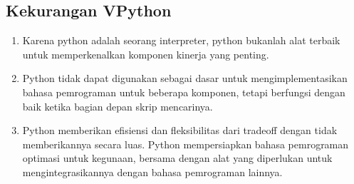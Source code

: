 \subsection{Kekurangan VPython}
		\begin {enumerate}
			
			\item Karena python adalah seorang interpreter, python bukanlah alat terbaik untuk memperkenalkan komponen kinerja yang penting.
			\item Python tidak dapat digunakan sebagai dasar untuk mengimplementasikan bahasa pemrograman untuk beberapa komponen, tetapi berfungsi dengan baik ketika bagian depan skrip mencarinya.
			\item Python memberikan efisiensi dan fleksibilitas dari tradeoff dengan tidak memberikannya secara luas. Python mempersiapkan bahasa pemrograman optimasi untuk kegunaan, bersama dengan alat yang diperlukan untuk mengintegrasikannya dengan bahasa pemrograman lainnya.
		\end{enumerate}
